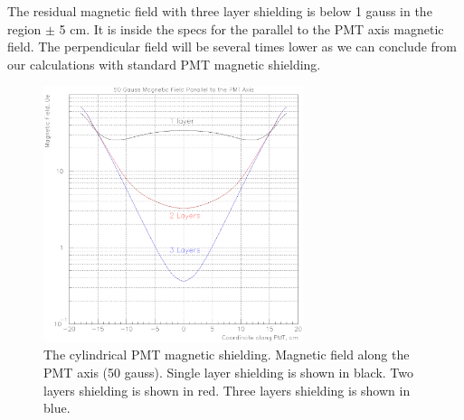 \documentclass[11pt,titlepage]{article}
\begin{document}
The residual magnetic field with three layer shielding is below 1 gauss in the region
$\pm$ 5 cm. It is inside the specs for the parallel to the PMT axis magnetic field.
The perpendicular field will be several times lower as we can conclude from our calculations with
standard PMT magnetic shielding.


 \begin{figure}
 \hspace{0.5cm}
 \begin{centering}
  \includegraphics[height=7.5cm]{3layers.eps}
 \vspace{0.5cm}
 \caption{\label{3layers}
The cylindrical PMT magnetic shielding.
Magnetic field along  the PMT axis (50 gauss).
Single layer shielding is shown in black.
Two layers shielding is shown in red.
Three layers shielding is shown in blue.}
\end{centering}
 \end{figure}
\end{document}
